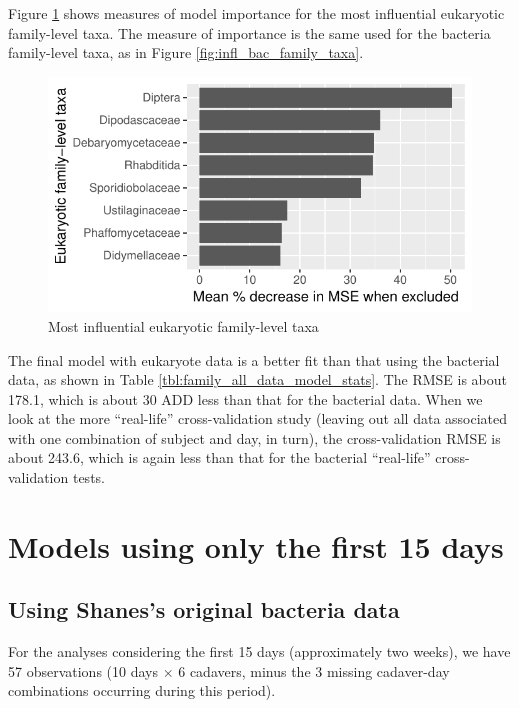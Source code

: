 \documentclass{article}
\begin{document}
Figure \ref{fig:infl_euk_family_taxa} shows measures of model
importance for the most influential eukaryotic family-level taxa.
The measure of importance is the same used for the bacteria
family-level taxa, as in Figure \ref{fig:infl_bac_family_taxa}.
\begin{figure}
  \centering
  \includegraphics{../eukaryote_data/only_families/all_time_steps/hit_1perc_twice/orig_units_all_data_families_PercIncMSE_barchart}
  \caption{Most influential eukaryotic family-level taxa}
  \label{fig:infl_euk_family_taxa}
\end{figure}

The final model with eukaryote data is a better fit than that using
the bacterial data, as shown in Table
\ref{tbl:family_all_data_model_stats}.  The RMSE is about 178.1, which
is about 30 ADD less than that for the bacterial data.  When we look
at the more ``real-life'' cross-validation study (leaving out all data
associated with one combination of subject and day, in turn), the
cross-validation RMSE is about 243.6, which is again less than that
for the bacterial ``real-life'' cross-validation tests.


\section{Models using only the first 15 days}

\subsection{Using Shanes's original bacteria data}

For the analyses considering the first 15 days (approximately two
weeks), we have 57 observations (10 days $\times$ 6 cadavers, minus
the 3 missing cadaver-day combinations occurring during this period).
\end{document}
